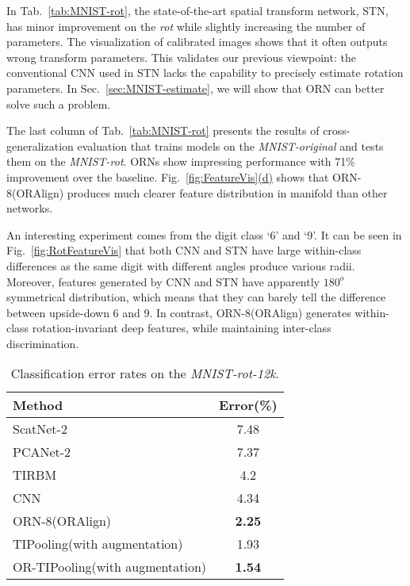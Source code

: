 \documentclass[10pt,twocolumn,letterpaper]{article}
\begin{document}
    In Tab.~\ref{tab:MNIST-rot}, the state-of-the-art spatial transform network, STN, has minor improvement on the \textit{rot} while slightly increasing the number of parameters. The visualization of calibrated images shows that it often outputs wrong transform parameters. This validates our previous viewpoint: the conventional CNN used in STN lacks the capability to precisely estimate rotation parameters. In Sec.~\ref{sec:MNIST-estimate}, we will show that ORN can better solve such a problem.

    The last column of Tab.~\ref{tab:MNIST-rot} presents the results of cross-generalization evaluation that trains models on the \textit{MNIST-original} and tests them on the \textit{MNIST-rot}. ORNs show impressing performance with 71\% improvement over the baseline. Fig.~\hyperref[fig:FeatureVis]{\ref*{fig:FeatureVis}(d)} shows that ORN-8(ORAlign) produces much clearer feature distribution in manifold than other networks.

    An interesting experiment comes from the digit class `6' and `9'. It can be seen in Fig.~\ref{fig:RotFeatureVis} that both CNN and STN have large within-class differences as the same digit with different angles produce various radii. Moreover, features generated by CNN and STN have apparently $180^o$ symmetrical distribution, which means that they can barely tell the difference between upside-down 6 and 9.
    In contrast, ORN-8(ORAlign) generates within-class rotation-invariant deep features, while maintaining inter-class discrimination.

    \begin{table}
        \begin{center}
            \begin{tabular}{|l|c|}
                \hline
                Method                          & Error(\%)     \\ \hline\hline
                ScatNet-2 \cite{Bruna2013}                    & 7.48          \\
                PCANet-2 \cite{Chan2015}                     & 7.37          \\
                TIRBM \cite{Sohn2012}                        & 4.2           \\ \hline
                CNN                             & 4.34          \\
                ORN-8(ORAlign)               & \textbf{2.25} \\ \hline
                TIPooling(with augmentation) \cite{Laptev2016}   & 1.93          \\
                OR-TIPooling(with augmentation) & \textbf{1.54} \\ \hline
            \end{tabular}
        \end{center}
        \caption{Classification error rates on the \textit{MNIST-rot-12k}.}
    \label{tab:MNIST-rot-small}
    \end{table}
\end{document}

